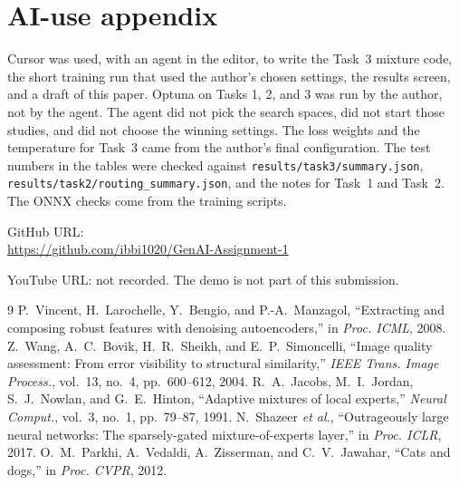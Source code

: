 \documentclass[conference]{IEEEtran}
\begin{document}
\section*{AI-use appendix}
Cursor was used, with an agent in the editor, to write the Task~3 mixture code, the short training run that used the author's chosen settings, the results screen, and a draft of this paper. Optuna on Tasks 1, 2, and 3 was run by the author, not by the agent. The agent did not pick the search spaces, did not start those studies, and did not choose the winning settings. The loss weights and the temperature for Task~3 came from the author's final configuration. The test numbers in the tables were checked against \texttt{results/task3/summary.json}, \texttt{results/task2/routing\_summary.json}, and the notes for Task~1 and Task~2. The ONNX checks come from the training scripts.

\noindent GitHub URL:\\
{\footnotesize\url{https://github.com/ibbi1020/GenAI-Assignment-1}}

YouTube URL: not recorded. The demo is not part of this submission.

\begin{thebibliography}{9}
P.~Vincent, H.~Larochelle, Y.~Bengio, and P.-A.~Manzagol, ``Extracting and composing robust features with denoising autoencoders,'' in \emph{Proc. ICML}, 2008.
Z.~Wang, A.~C.~Bovik, H.~R.~Sheikh, and E.~P.~Simoncelli, ``Image quality assessment: From error visibility to structural similarity,'' \emph{IEEE Trans. Image Process.}, vol.~13, no.~4, pp.~600--612, 2004.
R.~A.~Jacobs, M.~I.~Jordan, S.~J.~Nowlan, and G.~E.~Hinton, ``Adaptive mixtures of local experts,'' \emph{Neural Comput.}, vol.~3, no.~1, pp.~79--87, 1991.
N.~Shazeer \emph{et al.}, ``Outrageously large neural networks: The sparsely-gated mixture-of-experts layer,'' in \emph{Proc. ICLR}, 2017.
O.~M.~Parkhi, A.~Vedaldi, A.~Zisserman, and C.~V.~Jawahar, ``Cats and dogs,'' in \emph{Proc. CVPR}, 2012.
\end{thebibliography}
\end{document}
